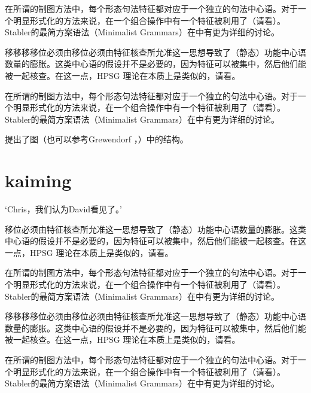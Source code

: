 \documentclass{scrbook}
\let\citew\citealp
\newcommand{\page}{}
\begin{document}
在所谓的制图方法中，每个形态句法特征都对应于一个独立的句法中心语\citep[\page 54, 61]{CR2010a}。对于一个明显形式化的方法来说，在一个组合操作中有一个特征被利用了（请看\citew[\page 335]{Stabler2001a}）。Stabler的最简方案语法（Minimalist Grammars）在中有更为详细的讨论。

移移移移位必须由移位必须由特征核查所允准这一思想导致了（静态）功能中心语数量的膨胀。这类中心语的假设并不是必要的，因为特征可以被集中，然后他们能被一起核查。在这一点，HPSG 理论在本质上是类似的，请看\citew[\S~II.3.3.4, \S~II.4.2]{Sternefeld2006a-u}。

在所谓的制图方法中，每个形态句法特征都对应于一个独立的句法中心语\citep[\page 54, 61]{CR2010a}。对于一个明显形式化的方法来说，在一个组合操作中有一个特征被利用了（请看\citew[\page 335]{Stabler2001a}）。Stabler的最简方案语法（Minimalist Grammars）在中有更为详细的讨论。

\citet[\page 297]{Rizzi97a-u}提出了图（也可以参考Grewendorf \citeyear[\page 85, 240]{Grewendorf2002a}，\citeyear{Grewendorf2009a}）中的结构。



\section{kaiming}

    `Chris，我们认为David看见了。'

移位必须由特征核查所允准这一思想导致了（静态）功能中心语数量的膨胀。这类中心语的假设并不是必要的，因为特征可以被集中，然后他们能被一起核查。在这一点，HPSG 理论在本质上是类似的，请看\citew[\S~II.3.3.4, \S~II.4.2]{Sternefeld2006a-u}。

在所谓的制图方法中，每个形态句法特征都对应于一个独立的句法中心语\citep[\page 54, 61]{CR2010a}。对于一个明显形式化的方法来说，在一个组合操作中有一个特征被利用了（请看\citew[\page 335]{Stabler2001a}）。Stabler的最简方案语法（Minimalist Grammars）在中有更为详细的讨论。

移移移移位必须由移位必须由特征核查所允准这一思想导致了（静态）功能中心语数量的膨胀。这类中心语的假设并不是必要的，因为特征可以被集中，然后他们能被一起核查。在这一点，HPSG 理论在本质上是类似的，请看\citew[\S~II.3.3.4, \S~II.4.2]{Sternefeld2006a-u}。

在所谓的制图方法中，每个形态句法特征都对应于一个独立的句法中心语\citep[\page 54, 61]{CR2010a}。对于一个明显形式化的方法来说，在一个组合操作中有一个特征被利用了（请看\citew[\page 335]{Stabler2001a}）。Stabler的最简方案语法（Minimalist Grammars）在中有更为详细的讨论。
\end{document}
